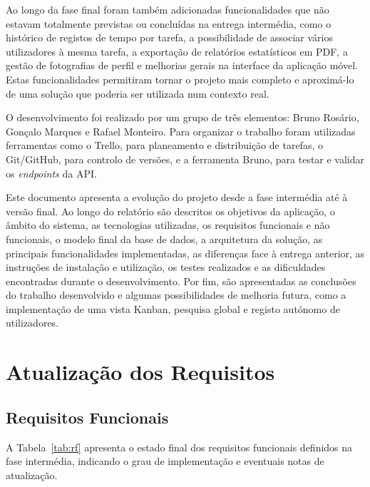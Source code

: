 \documentclass[12pt,a4paper]{article}
\begin{document}
Ao longo da fase final foram também adicionadas funcionalidades que não estavam totalmente previstas ou concluídas na entrega intermédia, como o histórico de registos de tempo por tarefa, a possibilidade de associar vários utilizadores à mesma tarefa, a exportação de relatórios estatísticos em PDF, a gestão de fotografias de perfil e melhorias gerais na interface da aplicação móvel. Estas funcionalidades permitiram tornar o projeto mais completo e aproximá-lo de uma solução que poderia ser utilizada num contexto real.

O desenvolvimento foi realizado por um grupo de três elementos: Bruno Rosário, Gonçalo Marques e Rafael Monteiro. Para organizar o trabalho foram utilizadas ferramentas como o Trello, para planeamento e distribuição de tarefas, o Git/GitHub, para controlo de versões, e a ferramenta Bruno, para testar e validar os \textit{endpoints} da API.

Este documento apresenta a evolução do projeto desde a fase intermédia até à versão final. Ao longo do relatório são descritos os objetivos da aplicação, o âmbito do sistema, as tecnologias utilizadas, os requisitos funcionais e não funcionais, o modelo final da base de dados, a arquitetura da solução, as principais funcionalidades implementadas, as diferenças face à entrega anterior, as instruções de instalação e utilização, os testes realizados e as dificuldades encontradas durante o desenvolvimento. Por fim, são apresentadas as conclusões do trabalho desenvolvido e algumas possibilidades de melhoria futura, como a implementação de uma vista Kanban, pesquisa global e registo autónomo de utilizadores.


\section{Atualização dos Requisitos}

\subsection{Requisitos Funcionais}

A Tabela~\ref{tab:rf} apresenta o estado final dos requisitos funcionais definidos na fase intermédia, indicando o grau de implementação e eventuais notas de atualização.
\end{document}

